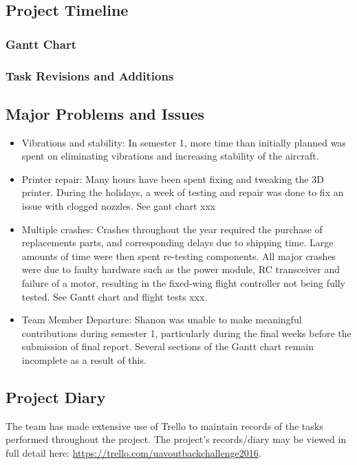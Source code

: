\subsection{Project Timeline}
\subsubsection{Gantt Chart}


\subsubsection{Task Revisions and Additions}

\subsection{Major Problems and Issues}
\begin{itemize}
	\item Vibrations and stability: In semester 1, more time than initially planned was spent on eliminating vibrations and increasing stability of the aircraft. 
	
	\item Printer repair: Many hours have been spent fixing and tweaking the 3D printer.  During the holidays, a week of testing and repair was done to fix an issue with clogged nozzles. See gant chart xxx
	
	\item Multiple crashes: Crashes throughout the year required the purchase of replacements parts, and corresponding delays due to shipping time. Large amounts of time were then spent re-testing components. All major crashes were due to faulty hardware such as the power module, RC transceiver and failure of a motor, resulting in the fixed-wing flight controller not being fully tested. See Gantt chart and flight tests xxx.
	
	\item Team Member Departure: Shanon was unable to make meaningful contributions during semester 1, particularly during the final weeks before the submission of final report. Several sections of the Gantt chart remain incomplete as a result of this.
\end{itemize}

\subsection{Project Diary}
The team has made extensive use of Trello to maintain records of the tasks performed throughout the project. The project's records/diary may be viewed in full detail here: \url{https://trello.com/uavoutbackchallenge2016}.

